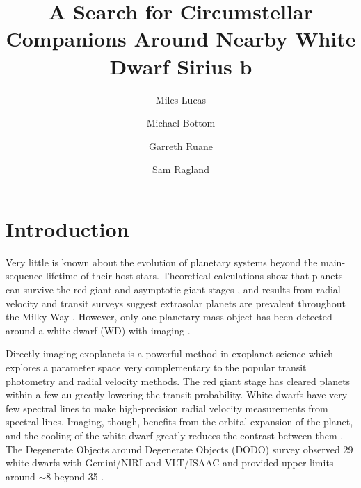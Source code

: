 \documentclass[twocolumn]{aastex631}
\begin{document}
\title{A Search for Circumstellar Companions Around Nearby White Dwarf Sirius b}



\author[0000-0001-6341-310X]{Miles Lucas}

\author[0000-0003-1341-5531]{Michael Bottom}

\author[0000-0003-4769-1665]{Garreth Ruane}

\author[0000-0002-0696-1780]{Sam Ragland}


\begin{abstract}

\end{abstract}

\section{Introduction} \label{sec:intro}

Very little is known about the evolution of planetary systems beyond the main-sequence lifetime of their host stars. Theoretical calculations show that planets can survive the red giant and asymptotic giant stages \citep{burleigh_imaging_2002,jura_pollution_2008,nordhaus_orbits_2013}, and results from radial velocity and transit surveys suggest extrasolar planets are prevalent throughout the Milky Way \citep{cumming_keck_2008}. However, only one planetary mass object has been detected around a white dwarf (WD) with imaging \citep[WD 0806-661;][]{luhman_discovery_2011}.

Directly imaging exoplanets is a powerful method in exoplanet science which explores a parameter space very complementary to the popular transit photometry and radial velocity methods. The red giant stage has cleared planets within a few \si{au} greatly lowering the transit probability. White dwarfs have very few spectral lines to make high-precision radial velocity measurements from spectral lines. Imaging, though, benefits from the orbital expansion of the planet, and the cooling of the white dwarf greatly reduces the contrast between them \citep{burleigh_imaging_2002,gould_finding_2008}. The Degenerate Objects around Degenerate Objects (DODO) survey observed 29 white dwarfs with Gemini/NIRI and VLT/ISAAC and provided upper limits around $\sim$\SI{8}{\mj} beyond \SI{35}{\au} \citep{hogan_dodo_2009}.
\end{document}
